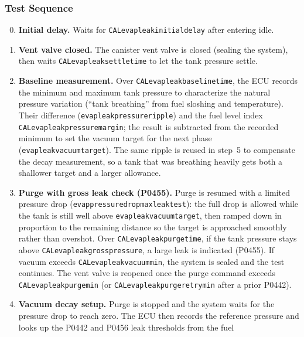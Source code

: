 \documentclass[a4paper,11pt]{article}
\renewcommand{\_}{\oldunderscore\allowbreak}
\begin{document}
\subsubsection*{Test Sequence}

\begin{enumerate}
\setcounter{enumi}{-1}
\item \textbf{Initial delay.} Waits for
      \texttt{CAL\_evap\_leak\_initial\_delay} after entering idle.
\item \textbf{Vent valve closed.} The canister vent valve is closed
      (sealing the system), then waits \texttt{CAL\_evap\_leak\_settle\_time}
      to let the tank pressure settle.
\item \textbf{Baseline measurement.} Over
      \texttt{CAL\_evap\_leak\_baseline\_time}, the ECU records the minimum
      and maximum tank pressure to characterize the natural pressure
      variation (``tank breathing'' from fuel sloshing and temperature).
      Their difference (\texttt{evap\_leak\_pressure\_ripple}) and the fuel
      level index \texttt{CAL\_evap\_leak\_pressure\_margin}; the result is
      subtracted from the recorded minimum to set the vacuum target for the
      next phase (\texttt{evap\_leak\_vacuum\_target}). The same ripple is
      reused in step~5 to compensate the decay measurement, so a tank that
      was breathing heavily gets both a shallower target and a larger
      allowance.
\item \textbf{Purge with gross leak check (P0455).} Purge is resumed with a
      limited pressure drop
      (\texttt{evap\_pressure\_drop\_max\_leak\_test}): the full drop is
      allowed while the tank is still well above
      \texttt{evap\_leak\_vacuum\_target}, then ramped down in proportion to
      the remaining distance so the target is approached smoothly rather than
      overshot. Over
      \texttt{CAL\_evap\_leak\_purge\_time}, if the tank pressure stays above
      \texttt{CAL\_evap\_leak\_gross\_pressure}, a large leak is indicated
      (P0455). If vacuum exceeds \texttt{CAL\_evap\_leak\_vacuum\_min}, the
      system is sealed and the test continues. The vent valve is reopened
      once the purge command exceeds
      \texttt{CAL\_evap\_leak\_purge\_min} (or
      \texttt{CAL\_evap\_leak\_purge\_retry\_min} after a prior P0442).
\item \textbf{Vacuum decay setup.} Purge is stopped and the system waits for
      the pressure drop to reach zero. The ECU then records the reference
      pressure and looks up the P0442 and P0456 leak thresholds from the fuel

\end{enumerate}
\end{document}
